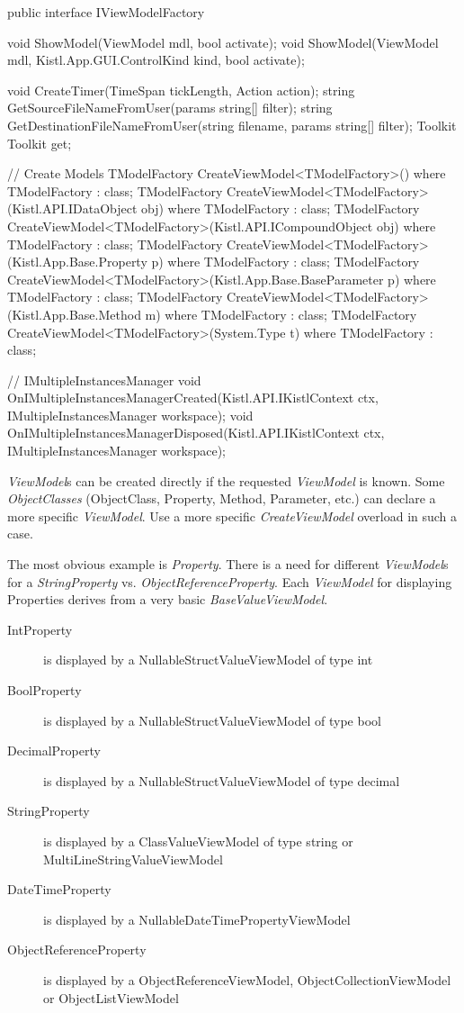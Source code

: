 \begin{CS}
public interface IViewModelFactory
{
    void ShowModel(ViewModel mdl, bool activate);
    void ShowModel(ViewModel mdl, Kistl.App.GUI.ControlKind kind, bool activate);

    void CreateTimer(TimeSpan tickLength, Action action);
    string GetSourceFileNameFromUser(params string[] filter);
    string GetDestinationFileNameFromUser(string filename, params string[] filter);
    Toolkit Toolkit { get; }

    // Create Models
    TModelFactory CreateViewModel<TModelFactory>() where TModelFactory : class;
    TModelFactory CreateViewModel<TModelFactory>(Kistl.API.IDataObject obj) where TModelFactory : class;
    TModelFactory CreateViewModel<TModelFactory>(Kistl.API.ICompoundObject obj) where TModelFactory : class;
    TModelFactory CreateViewModel<TModelFactory>(Kistl.App.Base.Property p) where TModelFactory : class;
    TModelFactory CreateViewModel<TModelFactory>(Kistl.App.Base.BaseParameter p) where TModelFactory : class;
    TModelFactory CreateViewModel<TModelFactory>(Kistl.App.Base.Method m) where TModelFactory : class;
    TModelFactory CreateViewModel<TModelFactory>(System.Type t) where TModelFactory : class;

    // IMultipleInstancesManager
    void OnIMultipleInstancesManagerCreated(Kistl.API.IKistlContext ctx, IMultipleInstancesManager workspace);
    void OnIMultipleInstancesManagerDisposed(Kistl.API.IKistlContext ctx, IMultipleInstancesManager workspace);
}
\end{CS}

\emph{ViewModel}s can be created directly if the requested \emph{ViewModel} is
known. Some \emph{ObjectClasses} (ObjectClass, Property, Method, Parameter,
etc.) can declare a more specific \emph{ViewModel}. Use a more specific
\emph{CreateViewModel} overload in such a case.

The most obvious example is \emph{Property}. There is a need for different
\emph{ViewModel}s for a \emph{StringProperty} vs.
\emph{ObjectReferenceProperty}. Each \emph{ViewModel} for displaying Properties
derives from a very basic \emph{BaseValueViewModel}.

\begin{description}
\item[IntProperty] { is displayed by a NullableStructValueViewModel of type int
}
\item[BoolProperty] { is displayed by a NullableStructValueViewModel of type
bool}
\item[DecimalProperty] { is displayed by a NullableStructValueViewModel of type
decimal }
\item[String\-Property] { is displayed by a ClassValue\-ViewModel of type string
or MultiLine\-StringValue\-View\-Model }
\item[DateTimeProperty] { is displayed by a NullableDateTimePropertyViewModel }
\item[ObjectReference\-Property] { is displayed by a
Object\-Reference\-ViewModel, Object\-Collection\-ViewModel or Object\-List\-ViewModel }
\end{description}

